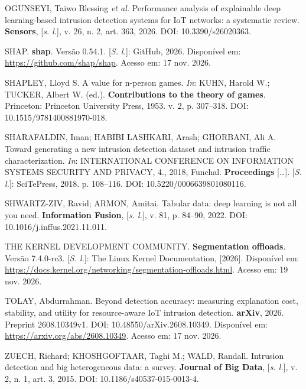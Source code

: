 \documentclass[
  article,
  12pt,
  oneside,
  a4paper,
  english,
  brazil
]{abntex2}
\newcommand{\secaosemnumero}[1]{%
  \par\addvspace{\baselineskip}%
  \phantomsection
  \pdfbookmark[1]{#1}{elemento-\thebookmarkelemento}%
  \stepcounter{bookmarkelemento}%
  {\centering\normalfont\normalsize\bfseries #1\par}%
  \nobreak\vspace{\baselineskip}}
\newcounter{bookmarkelemento}
\begin{document}
OGUNSEYI, Taiwo Blessing \emph{et al.} Performance analysis of explainable deep learning-based
intrusion detection systems for IoT networks: a systematic review. \textbf{Sensors},
[\emph{s. l.}], v. 26, n. 2, art. 363, 2026. DOI: 10.3390/s26020363.\par

SHAP. \textbf{shap}. Versão 0.54.1. [\emph{S. l.}]: GitHub, 2026. Disponível em:
\url{https://github.com/shap/shap}. Acesso em: 17 nov. 2026.\par

SHAPLEY, Lloyd S. A value for n-person games. \emph{In}: KUHN, Harold W.; TUCKER, Albert W. (ed.).
\textbf{Contributions to the theory of games}. Princeton: Princeton University Press, 1953. v. 2,
p. 307--318. DOI: 10.1515/9781400881970-018.\par

SHARAFALDIN, Iman; HABIBI LASHKARI, Arash; GHORBANI, Ali A. Toward generating a new intrusion
detection dataset and intrusion traffic characterization. \emph{In}: INTERNATIONAL CONFERENCE ON
INFORMATION SYSTEMS SECURITY AND PRIVACY, 4., 2018, Funchal. \textbf{Proceedings} [\ldots].
[\emph{S. l.}]: SciTePress, 2018. p. 108--116. DOI: 10.5220/0006639801080116.\par

SHWARTZ-ZIV, Ravid; ARMON, Amitai. Tabular data: deep learning is not all you need.
\textbf{Information Fusion}, [\emph{s. l.}], v. 81, p. 84--90, 2022. DOI:
10.1016/j.inffus.2021.11.011.\par

THE KERNEL DEVELOPMENT COMMUNITY. \textbf{Segmentation offloads}. Versão 7.4.0-rc3. [\emph{S. l.}]:
The Linux Kernel Documentation, [2026]. Disponível em:
\url{https://docs.kernel.org/networking/segmentation-offloads.html}. Acesso em: 19 nov. 2026.\par

TOLAY, Abdurrahman. Beyond detection accuracy: measuring explanation cost, stability, and utility
for resource-aware IoT intrusion detection. \textbf{arXiv}, 2026. Preprint 2608.10349v1. DOI:
10.48550/arXiv.2608.10349. Disponível em: \url{https://arxiv.org/abs/2608.10349}. Acesso em: 17
nov. 2026.\par

ZUECH, Richard; KHOSHGOFTAAR, Taghi M.; WALD, Randall. Intrusion detection and big heterogeneous
data: a survey. \textbf{Journal of Big Data}, [\emph{s. l.}], v. 2, n. 1, art. 3, 2015. DOI:
10.1186/s40537-015-0013-4.\par
\endgroup


%
%
\end{document}
